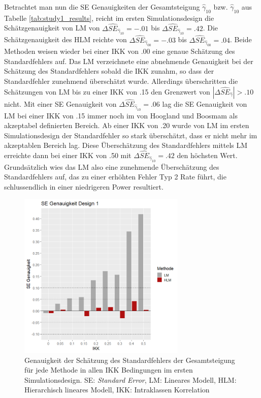 \documentclass[12pt]{article}\usepackage[]{graphicx}\usepackage[]{color}
\begin{document}
Betrachtet man nun die SE Genauigkeiten der Gesamtsteigung $\widehat{\gamma}_{10}$ bzw. $\widehat{\gamma}_{10}$ aus Tabelle \ref{tab:study1_results}, reicht im ersten Simulationsdesign die Schätzgenauigkeit von LM von $\Delta\widehat{SE}_{\widehat{\gamma}_{10}} = -.01$ bis $\Delta\widehat{SE}_{\widehat{\gamma}_{10}} = .42$. Die Schätzgenauigkeit des HLM reichte von $\Delta\widehat{SE}_{\widehat{\gamma}_{00}} = -.03$ bis $\Delta\widehat{SE}_{\widehat{\gamma}_{00}} = .04$. Beide Methoden weisen wieder bei einer IKK von .00 eine genaue Schätzung des Standardfehlers auf. Das LM verzeichnete eine abnehmende Genauigkeit bei der Schätzung des Standardfehlers sobald die IKK zunahm, so dass der Standardfehler zunehmend überschätzt wurde. Allerdings überschritten die Schätzungen von LM bis zu einer IKK von .15 den Grenzwert von $|\Delta\widehat{SE}_{\widehat{\gamma}}| > .10$ nicht. Mit einer SE Genauigkeit von $\Delta\widehat{SE}_{\widehat{\gamma}_{10}} = .06$ lag die SE Genauigkeit von LM bei einer IKK von .15 immer noch im von Hoogland und Boosmam \citeyearpar{hooglandboosma1998robustness} als akzeptabel definierten Bereich. Ab einer IKK von .20 wurde von LM im ersten Simulationsdesign der Standardfehler so stark überschätzt, dass er nicht mehr im akzeptablen Bereich lag. Diese Überschätzung des Standardfehlers mittels LM erreichte dann bei einer IKK von .50 mit $\Delta\widehat{SE}_{\widehat{\gamma}_{10}} = .42$ den höchsten Wert. Grundsätzlich wies das LM also eine zunehmende Überschätzung des Standardfehlers auf, das zu einer erhöhten Fehler Typ 2 Rate führt, die schlussendlich in einer niedrigeren Power resultiert. 
\begin{figure}[t!]
\centering
\captionsetup{width=8cm}
\includegraphics[width=8cm, height=8cm]{se_genauigkeit_design1}
\caption{Genauigkeit der Schätzung des Standardfehlers der Gesamtsteigung für jede Methode in allen IKK Bedingungen im ersten Simulationsdesign. SE: \textit{Standard Error}, LM: Lineares Modell, HLM: Hierarchisch lineares Modell, IKK: Intraklassen Korrelation}
\label{fig:se_genauigkeit_design1}
\end{figure}
\end{document}
